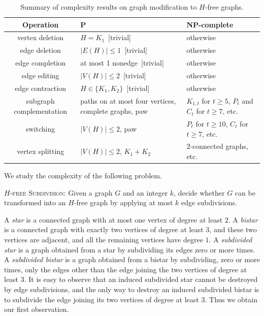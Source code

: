 \documentclass[a4paper,UKenglish,cleveref, autoref, thm-restate]{lipics-v2021}
\begin{document}
\begin{table}[ht]
\centering
\begin{tabular}{|c|p{4cm}|p{4cm}|}
\hline
\textbf{Operation} & \textbf{P} & \textbf{NP-complete} \\
\hline
vertex deletion
& $H=K_1$~[trivial]
& otherwise~\cite{yannakakis1978node} \\
\hline
edge deletion
& $|E(H)|\leq 1$~[trivial]
& otherwise~\cite{DBLP:journals/siamdm/AravindSS17} \\
\hline
edge completion
& at most 1 nonedge~[trivial]
& otherwise~\cite{DBLP:journals/siamdm/AravindSS17} \\
\hline
edge editing
& $|V(H)|\leq 2$~[trivial]
& otherwise~\cite{DBLP:journals/siamdm/AravindSS17} \\
\hline
edge contraction
& $H\in\{K_1,K_2\}$~[trivial]
& otherwise~\cite{chakraborty2023contracting} \\
\hline
subgraph complementation
& paths on at most four vertices, complete graphs, paw~\cite{antony2022subgraph}
& $K_{1,t}$ for $t\geq 5$, $P_t$ and $C_t$ for $t\geq 7$, etc.~\cite{antony2022subgraph} \\
\hline
switching
& $|V(H)|\leq 2$, paw~\cite{antony2024switching}
& $P_t$ for $t\geq 10$, $C_t$ for $t\geq 7$, etc.~\cite{antony2024switching} \\
\hline
vertex splitting
& $|V(H)|\leq 2$, $K_1+K_2$~\cite{firbas2024complexity}
& $2$-connected graphs, etc.~\cite{firbas2024complexity} \\
\hline
\end{tabular}
\caption{Summary of complexity results on graph modification to $H$-free graphs.}
\label{tab:complexity-summary}
\end{table}

We study the complexity of the following problem.

\medskip
\noindent
\textsc{$H$-free Subdivision}: Given a graph $G$ and an integer $k$, decide whether $G$ can be transformed into an $H$-free graph by applying at most $k$ edge subdivisions.

\medskip
A \emph{star} is a connected graph with at most one vertex of degree at least $2$.
A \emph{bistar} is a connected graph with exactly two vertices of degree at least $3$, and these two vertices are adjacent, and all the remaining vertices have degree $1$.
A \emph{subdivided star} is a graph obtained from a star by subdividing its edges zero or more times. 
A \emph{subdivided bistar} is a graph obtained from a bistar by subdividing, zero or more times, only the edges other than the edge joining the two vertices of degree at least $3$.
It is easy to observe that an induced subdivided star cannot be destroyed by edge subdivisions, and the only way to destroy an induced subdivided bistar is to subdivide the edge joining its two vertices of degree at least $3$.
Thus we obtain our first observation.
\end{document}
